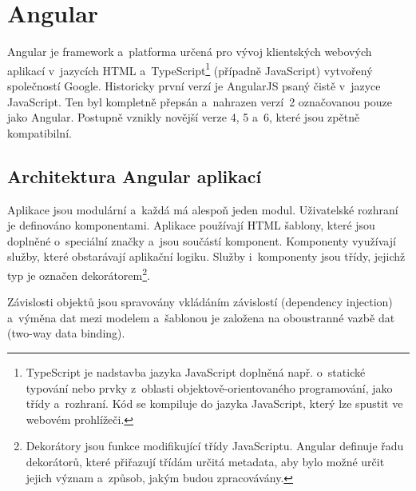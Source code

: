 \documentclass[
  digital, %
  oneside, %
  table,   %
  nolof,     %
  nolot,     %
  nocover
]{fithesis3}
\begin{document}
\section{Angular}
Angular je framework a~platforma určená pro vývoj klientských webových aplikací v~jazycích HTML a~TypeScript\footnote{TypeScript je nadstavba jazyka JavaScript doplněná např. o~statické typování nebo prvky z~oblasti objektově-orientovaného programování, jako třídy a~rozhraní. Kód se kompiluje do jazyka JavaScript, který lze spustit ve webovém prohlížeči.} (případně JavaScript) vytvořený společností Google. Historicky první verzí je AngularJS psaný čistě v~jazyce JavaScript. Ten byl kompletně přepsán a~nahrazen verzí~2 označovanou pouze jako Angular. Postupně vznikly novější verze 4, 5 a~6, které jsou zpětně kompatibilní.\par

\subsection{Architektura Angular aplikací}
Aplikace jsou modulární a~každá má alespoň jeden modul. Uživatelské rozhraní je definováno komponentami. Aplikace používají HTML šablony, které jsou doplněné o~speciální značky a~jsou součástí komponent. Komponenty využívají služby, které obstarávají aplikační logiku. Služby i~komponenty jsou třídy, jejichž typ je označen dekorátorem\footnote{Dekorátory jsou funkce modifikující třídy JavaScriptu. Angular definuje řadu dekorátorů, které přiřazují třídám určitá metadata, aby bylo možné určit jejich význam a~způsob, jakým budou zpracovávány.}.\par
Závislosti objektů jsou spravovány vkládáním závislostí (dependency injection) a~výměna dat mezi modelem a~šablonou je založena na oboustranné vazbě dat (two-way data binding). \cite{angulario}
\end{document}
